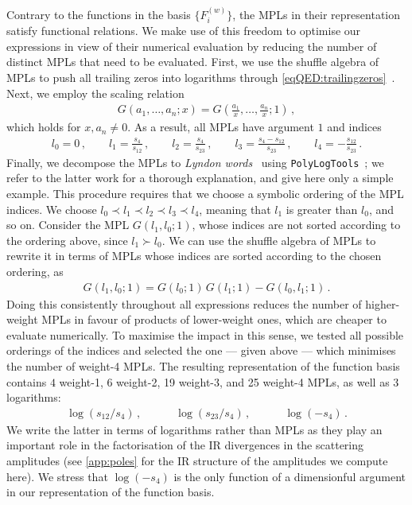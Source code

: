 \documentclass[main.tex]{subfiles}
\begin{document}
Contrary to the functions in the basis $\{F^{(w)}_i\}$, the MPLs in their representation satisfy functional relations. We make use of this freedom to optimise our expressions in view of their numerical evaluation by reducing the number of distinct MPLs that need to be evaluated. First, we use the shuffle algebra of MPLs to push all trailing zeros into logarithms through \cref{eqQED:trailingzeros}~\cite{Vollinga:2004sn}. Next, we employ the scaling relation
\begin{align}
G(a_1, \ldots, a_n; x) = G\left(\frac{a_1}{x}, \ldots, \frac{a_n}{x}; 1\right) \,,
\end{align}
which holds for $x, a_n \neq 0$. As a result, all MPLs have argument $1$ and indices
\begin{align} \label{eqQED:indices}
l_0 = 0 \,, \qquad 
l_1 = \frac{s_4}{s_{12}} \,, \qquad 
l_2 = \frac{s_4}{s_{23}} \,, \qquad
l_3 = \frac{s_4-s_{12}}{s_{23}} \,, \qquad
l_4 = - \frac{s_{12}}{s_{23}}\,.
\end{align}
%
Finally, we decompose the MPLs to \emph{Lyndon words}~\cite{Radford1979ANR} using \texttt{PolyLogTools}~\cite{Duhr:2019tlz}; we refer to the latter work for a thorough explanation, and give here only a simple example. 
This procedure requires that we choose a symbolic ordering of the MPL indices. We choose $l_0 \prec l_1 \prec l_2 \prec l_3 \prec l_4$, meaning that $l_1$ is greater than $l_0$, and so on. 
Consider the MPL $G(l_1, l_0; 1)$, whose indices are not sorted according to the ordering above, since $l_1 \succ l_0$. We can use the shuffle algebra of MPLs to rewrite it in terms of MPLs whose indices are sorted according to the chosen ordering, as
\begin{align}
G(l_1, l_0; 1) = G(l_0;1) \, G(l_1;1) - G(l_0, l_1; 1) \,.
\end{align}
Doing this consistently throughout all expressions reduces the number of higher-weight MPLs in favour of products of lower-weight ones, which are cheaper to evaluate numerically. To maximise the impact in this sense, we tested all possible orderings of the indices and selected the one --- given above --- which minimises the number of weight-4 MPLs.
The resulting representation of the function basis contains $4$ weight-1, 6 weight-2, 19 weight-3, and 25 weight-4 MPLs, as well as $3$ logarithms: 
\begin{align} \label{eqQED:logs}
\log(s_{12}/s_4) \,, \qquad \quad \log(s_{23}/s_4) \,, \qquad \quad \log(-s_4) \,.
\end{align}
We write the latter in terms of logarithms rather than MPLs as they play an important role in the factorisation of the IR divergences in the scattering amplitudes (see \cref{app:poles} for the IR structure of the amplitudes we compute here). We stress that $\log(-s_4)$ is the only function of a dimensionful argument in our representation of the function basis. 
\end{document}
